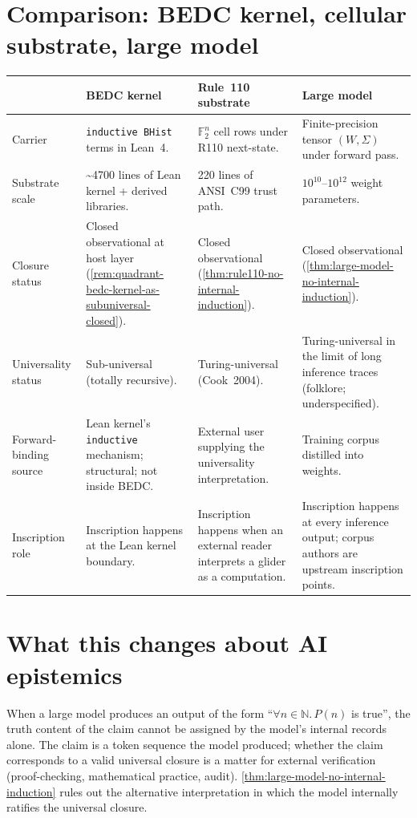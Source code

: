 \section{Comparison: BEDC kernel, cellular substrate, large model}
\label{sec:large-model-comparison}

\begin{longtable}{p{}p{}p{}p{}}
\toprule
& \textbf{BEDC kernel} & \textbf{Rule~110 substrate} & \textbf{Large model} \\
\midrule
Carrier &
\texttt{inductive BHist} terms in Lean~4.
&
$\mathbb{F}_2^n$ cell rows under R110 next-state.
&
Finite-precision tensor $(W, \Sigma)$ under forward pass. \\
\midrule
Substrate scale &
\textasciitilde 4700 lines of Lean kernel + derived libraries.
&
220 lines of ANSI~C99 trust path.
&
$10^{10}$--$10^{12}$ weight parameters. \\
\midrule
Closure status &
Closed observational at host layer (\autoref{rem:quadrant-bedc-kernel-as-subuniversal-closed}).
&
Closed observational (\autoref{thm:rule110-no-internal-induction}).
&
Closed observational (\autoref{thm:large-model-no-internal-induction}). \\
\midrule
Universality status &
Sub-universal (totally recursive).
&
Turing-universal (Cook~2004).
&
Turing-universal in the limit of long inference traces (folklore; underspecified). \\
\midrule
Forward-binding source &
Lean kernel's \texttt{inductive} mechanism; structural; not inside BEDC.
&
External user supplying the universality interpretation.
&
Training corpus distilled into weights. \\
\midrule
Inscription role &
Inscription happens at the Lean kernel boundary.
&
Inscription happens when an external reader interprets a glider as a computation.
&
Inscription happens at every inference output; corpus authors are upstream inscription points. \\
\bottomrule
\end{longtable}

\section{What this changes about AI epistemics}
\label{sec:large-model-ai-epistemics}

\begin{principle}
\label{prin:large-model-universal-claims-externally-interpreted}
When a large model produces an output of the form ``$\forall n \in \mathbb{N}.\, P(n)$ is true'', the truth content of the claim cannot be assigned by the model's internal records alone. The claim is a token sequence the model produced; whether the claim corresponds to a valid universal closure is a matter for external verification (proof-checking, mathematical practice, audit). \autoref{thm:large-model-no-internal-induction} rules out the alternative interpretation in which the model internally ratifies the universal closure.
\end{principle}

